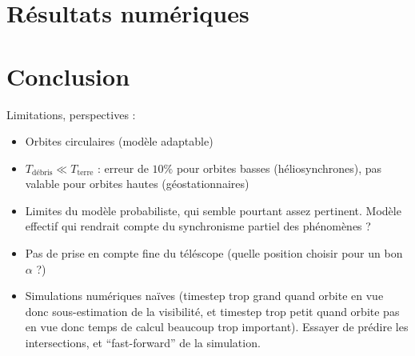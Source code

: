 \documentclass[11pt,a4paper,reqno]{amsart}
\begin{document}
\section{Résultats numériques}

\section{Conclusion}
Limitations, perspectives :
\begin{itemize}
\item Orbites circulaires (modèle adaptable)
\item $T_{\text{débris}} \ll T_{\text{terre}}$ : erreur de $10\%$ pour
  orbites basses (héliosynchrones), pas valable pour orbites hautes
  (géostationnaires)
\item Limites du modèle probabiliste, qui semble pourtant assez
  pertinent. Modèle effectif qui rendrait compte du synchronisme
  partiel des phénomènes ?
\item Pas de prise en compte fine du téléscope (quelle position
  choisir pour un bon $\alpha$ ?)
\item Simulations numériques naïves (timestep trop grand quand orbite
  en vue donc sous-estimation de la visibilité, et timestep trop petit
  quand orbite pas en vue donc temps de calcul beaucoup trop
  important). Essayer de prédire les intersections, et
  ``fast-forward'' de la simulation.
\end{itemize}
\end{document}
